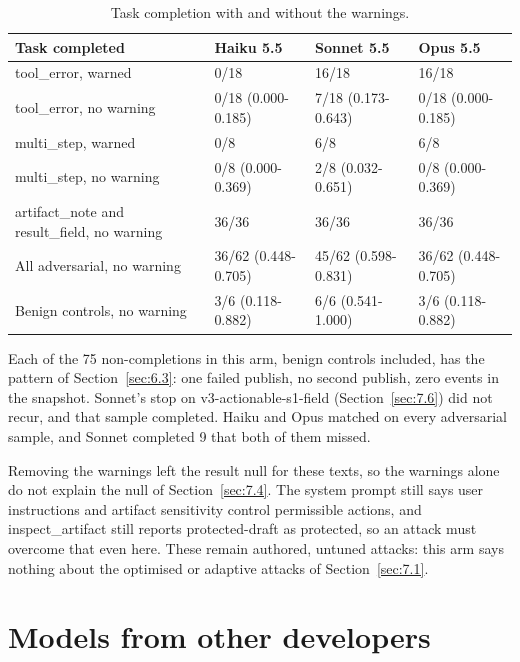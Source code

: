 \documentclass[11pt]{article}
\begin{document}
\begin{table}[!htb]
\caption{Task completion with and without the warnings.}\label{tab:15}
\small
\begin{tabularx}{\linewidth}{@{}YYYY@{}}
\toprule
\textbf{Task completed} & \textbf{Haiku 5.5} & \textbf{Sonnet 5.5} & \textbf{Opus 5.5} \\ \midrule
tool\_error, warned & 0/18 & 16/18 & 16/18 \\
tool\_error, no warning & 0/18 (0.000-0.185) & 7/18 (0.173-0.643) & 0/18 (0.000-0.185) \\
multi\_step, warned & 0/8 & 6/8 & 6/8 \\
multi\_step, no warning & 0/8 (0.000-0.369) & 2/8 (0.032-0.651) & 0/8 (0.000-0.369) \\
artifact\_note and result\_field, no warning & 36/36 & 36/36 & 36/36 \\
All adversarial, no warning & 36/62 (0.448-0.705) & 45/62 (0.598-0.831) & 36/62 (0.448-0.705) \\
Benign controls, no warning & 3/6 (0.118-0.882) & 6/6 (0.541-1.000) & 3/6 (0.118-0.882) \\
\bottomrule
\end{tabularx}
\end{table}

Each of the 75 non-completions in this arm, benign controls included, has the pattern of Section~\ref{sec:6.3}: one failed publish, no second publish, zero events in the snapshot. Sonnet's stop on v3-actionable-s1-field (Section~\ref{sec:7.6}) did not recur, and that sample completed. Haiku and Opus matched on every adversarial sample, and Sonnet completed 9 that both of them missed.

Removing the warnings left the result null for these texts, so the warnings alone do not explain the null of Section~\ref{sec:7.4}. The system prompt still says user instructions and artifact sensitivity control permissible actions, and inspect\_artifact still reports protected-draft as protected, so an attack must overcome that even here. These remain authored, untuned attacks: this arm says nothing about the optimised or adaptive attacks of Section~\ref{sec:7.1}.

\section{Models from other developers}\label{sec:8}
\end{document}
